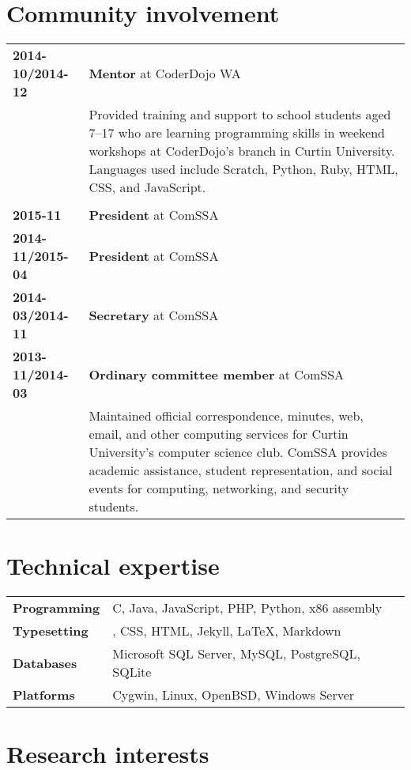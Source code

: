\documentclass[a4paper,12pt]{article}
\begin{document}
\section*{Community involvement}

\begin{tabular}{p{3.5cm}p{12.5cm}}
	\textbf{2014-10/2014-12} &
		\textbf{Mentor} at CoderDojo WA\\ &
		Provided training and support to school students aged 7--17
		who are learning programming skills in weekend workshops at
		CoderDojo's branch in Curtin University. Languages used include
		Scratch, Python, Ruby, HTML, CSS, and JavaScript.\\\\
	\textbf{2015-11} &
		\textbf{President} at ComSSA\\
	\textbf{2014-11/2015-04} &
		\textbf{President} at ComSSA\\
	\textbf{2014-03/2014-11} &
		\textbf{Secretary} at ComSSA\\
	\textbf{2013-11/2014-03} &
		\textbf{Ordinary committee member} at ComSSA\\ &
		Maintained official correspondence, minutes, web, email, and
		other computing services for Curtin University's computer
		science club. ComSSA provides academic assistance, student
		representation, and social events for computing, networking,
		and security students.
\end{tabular}

\newpage

\section*{Technical expertise}

\begin{tabular}{p{3.5cm}p{12.5cm}}
	\textbf{Programming} &
		C, Java, JavaScript, PHP, Python, x86 assembly \\
	\textbf{Typesetting} &
		\hologo{BibTeX}, CSS, HTML, Jekyll, \LaTeX, Markdown \\
	\textbf{Databases} &
		Microsoft SQL Server, MySQL, PostgreSQL, SQLite \\
	\textbf{Platforms} &
		Cygwin, Linux, OpenBSD, Windows Server
\end{tabular}

\section*{Research interests}
\end{document}
